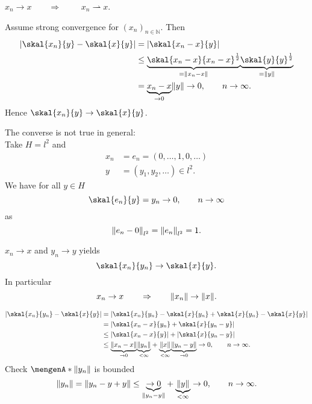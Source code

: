 \begin{satz}
	$x_n \to x$$ \qquad \Rightarrow \qquad $ $x_n \rightharpoonup x$.
\end{satz}

\begin{beweis}
	Assume strong convergence for $(x_n)_{n \in \mathbb{N}}$. Then
	\begin{align*}
		\abs{\skal{x_n}{y}- \skal{x}{y}} &= \abs{\skal{x_n-x}{y}} \\
		&\leq \underset{=\norm{x_n-x}}{\underbrace{\skal{x_n-x}{x_n-x}^{\frac{1}{2}}}} \underset{= \norm{y}}{\underbrace{\skal{y}{y}^{\frac{1}{2}}}} \\
		&= \underset{ \to 0}{\underbrace{x_n-x}} \norm{y} \to 0, \qquad n \to \infty.
	\end{align*}
	Hence $\skal{x_n}{y} \to \skal{x}{y}$.
\end{beweis}

\begin{bemerkung}
	The converse is not true in general: \\
	Take $H=l^2$ and 
	\begin{align*}
		x_n &= e_n = (0, \dots,1,0,\dots) \\
		y &= (y_1,y_2,\dots) \in l^2.
	\end{align*}
	We have for all $y \in H$
	\[
		\skal{e_n}{y} = y_n \to 0, \qquad n \to \infty
	\]
	as
	\[
		\norm{e_n -0}_{l^2} = \norm{e_n}_{l^2} =1.
	\]
\end{bemerkung}

\begin{satz}
	$x_n \to x$ and $y_n \to y$ yields
	\[
		\skal{x_n}{y_n} \to \skal{x}{y}.
	\]
	In particular
	\[
		x_n \to x \qquad \Rightarrow \qquad \norm{x_n} \to \norm{x}.
	\]
\end{satz}
\begin{beweis}
	\begin{align*}
		\abs{\skal{x_n}{y_n}-\skal{x}{y}} &= \abs{\skal{x_n}{y_n}-\skal{x}{y_n} + \skal{x}{y_n} - \skal{x}{y}} \\
		&= \abs{\skal{x_n -x}{y_n} + \skal{x}{y_n-y}} \\
		&\leq \abs{\skal{x_n-x}{y}} + \abs{\skal{x}{y_n-y}} \\
		&\leq \underset{\to 0}{\underbrace{\norm{x_n-x}}} \underset{< \infty}{\underbrace{\norm{y_n}}} + \underset{< \infty}{\underbrace{\norm{x}}} \underset{\to 0}{\underbrace{\norm{y_n-y}}} \to 0, \qquad  n \to \infty.
	\end{align*}
	Check $\set{\norm{y_n}}$ is bounded
	\[
		\norm{y_n} = \norm{y_n -y +y} \leq \underset{\norm{y_n -y}}{\underbrace{\to 0}}+ \underset{< \infty}{\underbrace{\norm{y}}} \to 0, \qquad n \to \infty.
	\]
\end{beweis}

